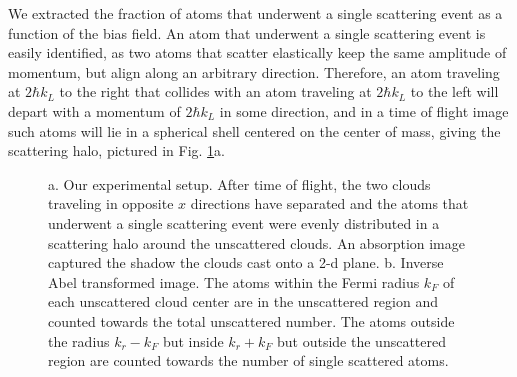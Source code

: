 \documentclass[12pt]{iopart}
\begin{document}
\par We extracted the fraction of atoms that underwent a single scattering event as a function of the bias field. An atom that underwent a single scattering event is easily identified, as two atoms that scatter elastically keep the same amplitude of momentum, but align along an arbitrary direction. Therefore, an atom traveling at $2 \hbar k_L$ to the right that collides with an atom traveling at $2 \hbar k_L$ to the left will depart with a momentum of $2 \hbar k_L$ in some direction, and in a time of flight image such atoms will lie in a spherical shell centered on the center of mass, giving the scattering halo, pictured in Fig. \ref{fig:halo}a. 
\begin{figure}
\caption{a. Our experimental setup. After time of flight, the two clouds traveling in opposite $x$ directions have separated and the atoms that underwent a single scattering event were evenly distributed in a scattering halo around the unscattered clouds. An absorption image captured the shadow the clouds cast onto a 2-d plane. b. Inverse Abel transformed image. The atoms within the Fermi radius $k_F$ of each unscattered cloud center are in the unscattered region and counted towards the total unscattered number. The atoms outside the radius $k_r-k_F$ but inside $k_r+k_F$ but outside the unscattered region are counted towards the number of single scattered atoms.   }  
\label{fig:halo}
\end{figure}
\end{document}

